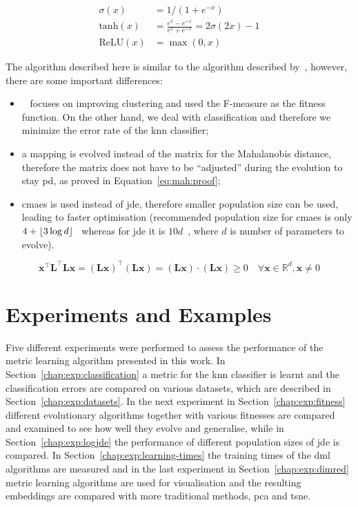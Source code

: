 \documentclass[12pt,a4paper]{report}
\begin{document}
\begin{align}
\sigma(x)      &= 1/(1+e^{-x}) \label{eq:nn:sigm} \\
\text{tanh}(x) &= \frac{e^x-e^{-x}}{e^x+e^{-x}} = 2\sigma(2x)-1 \label{eq:nn:tanh} \\
\text{ReLU}(x) &= \max(0,x) \label{eq:nn:relu}
\end{align}

The algorithm described here is similar to the algorithm described by~\citep{fukui2013evolutionary}, however, there are some important differences:
\begin{itemize}
\item~\citep{fukui2013evolutionary} focuses on improving clustering and used the F-measure as the fitness function. On the other hand, we deal with classification and therefore we minimize the error rate of the \ac{knn} classifier;
\item a mapping is evolved instead of the matrix for the Mahalanobis distance, therefore the matrix does not have to be ``adjusted'' during the evolution to stay \ac{pd}, as proved in Equation~\ref{eq:mah:proof};
\item \ac{cmaes} is used instead of \ac{jde}, therefore smaller population size can be used, leading to faster optimisation (recommended population size for \ac{cmaes} is only $4+\lfloor3\log{d}\rfloor$~\citep{hansen2006cma} whereas for \ac{jde} it is $10d$~\citep{brest2006self}, where $d$ is number of parameters to evolve).
\end{itemize}

\begin{equation}
\bm{x}^\top \bm{L}^\top \bm{L}\bm{x}=(\bm{Lx})^\top(\bm{Lx})=(\bm{Lx})\cdot (\bm{Lx})\geq 0 \quad \forall \bm{x} \in \mathbb{R}^d, \bm{x} \neq 0 \label{eq:mah:proof}
\end{equation}



\chapter{Experiments and Examples} \label{chap:exp}
Five different experiments were performed to assess the performance of the metric learning algorithm presented in this work. In Section~\ref{chap:exp:classification} a metric for the \ac{knn} classifier is learnt and the classification errors are compared on various datasets, which are described in Section~\ref{chap:exp:datasets}. In the next experiment in Section~\ref{chap:exp:fitness} different evolutionary algorithms together with various fitnesses  are compared and examined to see how well they evolve and generalise, while in Section~\ref{chap:exp:logjde} the performance of different population sizes of \ac{jde} is compared. In Section~\ref{chap:exp:learning-times} the training times of the \ac{dml} algorithms are measured and in the last experiment in Section~\ref{chap:exp:dimred} metric learning algorithms are used for visualisation and the resulting embeddings are compared with more traditional methods, \ac{pca} and \ac{tsne}.
\end{document}
